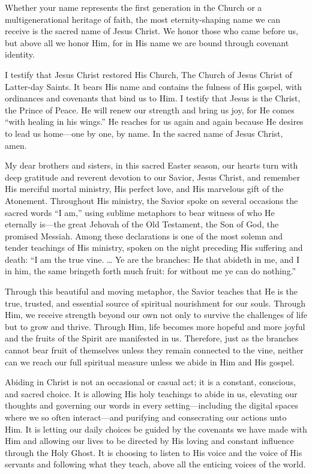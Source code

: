 \documentclass[letterpaper, 11pt]{report}
\newcommand{\speaker}{}
\newcommand{\talk}{}
\newcommand{\talkdatestr}{}
\newcommand{\setspeaker}[1]{\renewcommand{\speaker}{#1}}
\newcommand{\settalk}[1]{\renewcommand{\talk}{#1}}
\newcommand{\talkheading}[2]{%
    \vspace{1em}
    \noindent{\huge\bfseries #1}
    \par\nopagebreak\vspace{0.25em}
    \noindent{\normalsize\bfseries #2\ifx\talkdatestr\empty\else,\ \talkdatestr\fi}
    \par\nopagebreak\vspace{0.5em}
}
\begin{document}
Whether your name represents the first generation in the Church or a multigenerational heritage of faith, the most eternity-shaping name we can receive is the sacred name of Jesus Christ. We honor those who came before us, but above all we honor Him, for in His name we are bound through covenant identity.

I testify that Jesus Christ restored His Church, The Church of Jesus Christ of Latter-day Saints. It bears His name and contains the fulness of His gospel, with ordinances and covenants that bind us to Him. I testify that Jesus is the Christ, the Prince of Peace. He will renew our strength and bring us joy, for He comes “with healing in his wings.” He reaches for us again and again because He desires to lead us home—one by one, by name. In the sacred name of Jesus Christ, amen.

\newpage
\settalk{Jesus Christ—the True Vine}
\setspeaker{Ulisses Soares}
\talkheading{Jesus Christ—the True Vine}{Ulisses Soares}

My dear brothers and sisters, in this sacred Easter season, our hearts turn with deep gratitude and reverent devotion to our Savior, Jesus Christ, and remember His merciful mortal ministry, His perfect love, and His marvelous gift of the Atonement. Throughout His ministry, the Savior spoke on several occasions the sacred words “I am,” using sublime metaphors to bear witness of who He eternally is—the great Jehovah of the Old Testament, the Son of God, the promised Messiah. Among these declarations is one of the most solemn and tender teachings of His ministry, spoken on the night preceding His suffering and death: “I am the true vine. … Ye are the branches: He that abideth in me, and I in him, the same bringeth forth much fruit: for without me ye can do nothing.”

Through this beautiful and moving metaphor, the Savior teaches that He is the true, trusted, and essential source of spiritual nourishment for our souls. Through Him, we receive strength beyond our own not only to survive the challenges of life but to grow and thrive. Through Him, life becomes more hopeful and more joyful and the fruits of the Spirit are manifested in us. Therefore, just as the branches cannot bear fruit of themselves unless they remain connected to the vine, neither can we reach our full spiritual measure unless we abide in Him and His gospel.

Abiding in Christ is not an occasional or casual act; it is a constant, conscious, and sacred choice. It is allowing His holy teachings to abide in us, elevating our thoughts and governing our words in every setting—including the digital spaces where we so often interact—and purifying and consecrating our actions unto Him. It is letting our daily choices be guided by the covenants we have made with Him and allowing our lives to be directed by His loving and constant influence through the Holy Ghost. It is choosing to listen to His voice and the voice of His servants and following what they teach, above all the enticing voices of the world.
\end{document}
